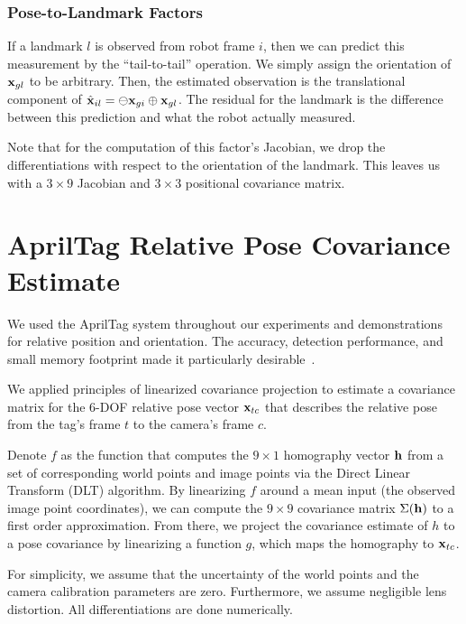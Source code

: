 \documentclass[conference]{IEEEtran}
\begin{document}
\subsubsection{Pose-to-Landmark Factors}
\label{subs:pointnodelinear}

If a landmark $l$ is observed from robot frame $i$, then we can predict this measurement
by the ``tail-to-tail'' operation.  We simply assign the orientation of ${\bf x}_{gl}$ to
be arbitrary.  Then, the estimated observation is the translational component of $ {\hat
  {\bf x}}_{il} = \ominus {\bf x}_{gi} \oplus {\bf x}_{gl} $. The residual for the
landmark is the difference between this prediction and what the robot actually measured.

Note that for the computation of this factor's Jacobian, we drop the differentiations with
respect to the orientation of the landmark.  This leaves us with a $3 \times 9$ Jacobian
and $3 \times 3$ positional covariance matrix. 

\section{AprilTag Relative Pose Covariance Estimate}
\label{sec:apriltags}


We used the AprilTag system throughout our experiments and demonstrations for
relative position and orientation.  The accuracy, detection performance, and small memory
footprint made it particularly desirable~\cite{olson2011tags}.

We applied principles of linearized covariance projection to estimate a covariance matrix
for the 6-\ac{DOF} relative pose vector ${\bf x}_{tc}$ that describes the relative pose from
the tag's frame $t$ to the camera's frame $c$.

Denote $f$ as the function that computes the $9 \times 1$ homography vector ${\bf h}$ from
a set of corresponding world points and image points via the Direct Linear Transform (DLT)
algorithm. By linearizing $f$ around a mean input (the observed image point coordinates),
we can compute the $9 \times 9$ covariance matrix $\Sigma({\bf h})$ to a first order
approximation. From there, we project the covariance estimate of $h$ to a pose covariance
by linearizing a function $g$, which maps the homography to ${\bf x}_{tc}$.

For simplicity, we assume that the uncertainty of the world points and the camera
calibration parameters are zero.  Furthermore, we assume negligible lens distortion.  All
differentiations are done numerically.
\end{document}
